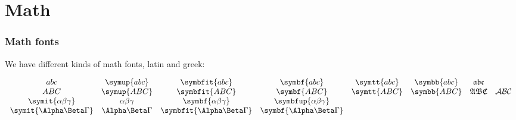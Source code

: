 \documentclass{beamer}
\begin{document}
\section*{Math}

\begin{frame}
    \frametitle{Math fonts}

    We have different kinds of math fonts, latin and greek:

    \[\begin{array}{cccccccc}
            abc                       & \symup{abc}       & \symbfit{abc}               & \symbf{abc}                 & \symtt{abc} & \symbb{abc} & \mathfrak{abc}                 \\
            ABC                       & \symup{ABC}       & \symbfit{ABC}               & \symbf{ABC}                 & \symtt{ABC} & \symbb{ABC} & \mathfrak{ABC} & \mathcal{ABC} \\
            \symit{\alpha\beta\gamma} & \alpha\beta\gamma & \symbf{\alpha\beta\gamma}   & \symbfup{\alpha\beta\gamma} &             &                                              \\
            \symit{\Alpha\Beta\Gamma} & \Alpha\Beta\Gamma & \symbfit{\Alpha\Beta\Gamma} & \symbf{\Alpha\Beta\Gamma}   &             &
        \end{array}\]

\end{frame}
\end{document}
